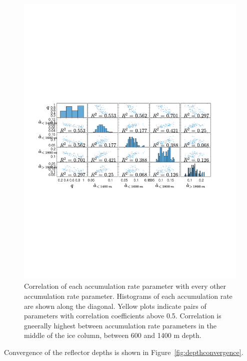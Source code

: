 \begin{figure}[ht]
\centering
\includegraphics[scale=0.3]{../analysis/figures/accumCorrelation}
\caption[]{Correlation of each accumulation rate parameter with every other accumulation rate parameter. Histograms of each accumulation rate are shown along the diagonal. Yellow plots indicate pairs of parameters with correlation coefficients above 0.5. Correlation is gneerally highest between accumulation rate parameters in the middle of the ice column, between 600 and 1400 m depth.}
\label{fig:accumCorrelation}
\end{figure}


Convergence of the reflector depths is shown in Figure~\ref{fig:depthconvergence}.


